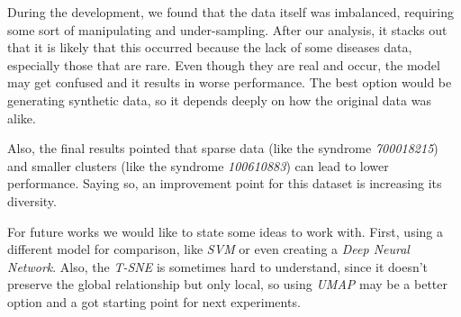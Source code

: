 \documentclass{article}
\begin{document}
During the development, we found that the data itself was imbalanced, requiring some sort of manipulating and under-sampling. After our analysis, it stacks out that it is likely that this occurred because the lack of some diseases data, especially those that are rare. Even though they are real and occur, the model may get confused and it results in worse performance. The best option would be generating synthetic data, so it depends deeply on how the original data was alike.

Also, the final results pointed that sparse data (like the syndrome \textit{700018215}) and smaller clusters (like the syndrome \textit{100610883}) can lead to lower performance. Saying so, an improvement point for this dataset is increasing its diversity.

For future works we would like to state some ideas to work with. First, using a different model for comparison, like \textit{SVM} or even creating a \textit{Deep Neural Network}. Also, the \textit{T-SNE} is sometimes hard to understand, since it doesn't preserve the global relationship but only local, so using \textit{UMAP} may be a better option and a got starting point for next experiments.


\printbibliography
\end{document}
